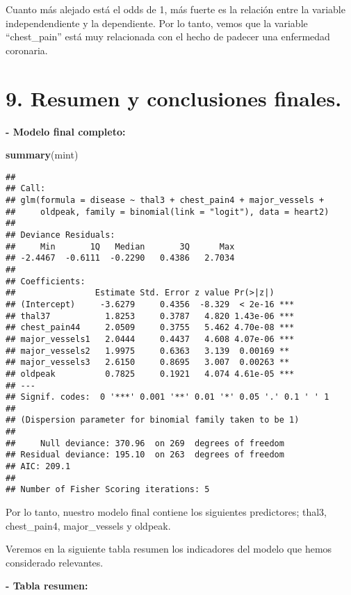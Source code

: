 \documentclass[]{article}
\newenvironment{Shaded}{\begin{snugshade}}{\end{snugshade}}
\newcommand{\KeywordTok}[1]{\textcolor[rgb]{0.13,0.29,0.53}{\textbf{#1}}}
\newcommand{\DataTypeTok}[1]{\textcolor[rgb]{0.13,0.29,0.53}{#1}}
\newcommand{\FloatTok}[1]{\textcolor[rgb]{0.00,0.00,0.81}{#1}}
\newcommand{\OperatorTok}[1]{\textcolor[rgb]{0.81,0.36,0.00}{\textbf{#1}}}
\newcommand{\NormalTok}[1]{#1}
\begin{document}
Cuanto más alejado está el odds de 1, más fuerte es la relación entre la
variable independendiente y la dependiente. Por lo tanto, vemos que la
variable ``chest\_pain'' está muy relacionada con el hecho de padecer
una enfermedad coronaria.

\section{9. Resumen y conclusiones
finales.}\label{resumen-y-conclusiones-finales.}

\textbf{- Modelo final completo:}

\begin{Shaded}
\begin{Highlighting}[]
\KeywordTok{summary}\NormalTok{(mint)}
\end{Highlighting}
\end{Shaded}

\begin{verbatim}
## 
## Call:
## glm(formula = disease ~ thal3 + chest_pain4 + major_vessels + 
##     oldpeak, family = binomial(link = "logit"), data = heart2)
## 
## Deviance Residuals: 
##     Min       1Q   Median       3Q      Max  
## -2.4467  -0.6111  -0.2290   0.4386   2.7034  
## 
## Coefficients:
##                Estimate Std. Error z value Pr(>|z|)    
## (Intercept)     -3.6279     0.4356  -8.329  < 2e-16 ***
## thal37           1.8253     0.3787   4.820 1.43e-06 ***
## chest_pain44     2.0509     0.3755   5.462 4.70e-08 ***
## major_vessels1   2.0444     0.4437   4.608 4.07e-06 ***
## major_vessels2   1.9975     0.6363   3.139  0.00169 ** 
## major_vessels3   2.6150     0.8695   3.007  0.00263 ** 
## oldpeak          0.7825     0.1921   4.074 4.61e-05 ***
## ---
## Signif. codes:  0 '***' 0.001 '**' 0.01 '*' 0.05 '.' 0.1 ' ' 1
## 
## (Dispersion parameter for binomial family taken to be 1)
## 
##     Null deviance: 370.96  on 269  degrees of freedom
## Residual deviance: 195.10  on 263  degrees of freedom
## AIC: 209.1
## 
## Number of Fisher Scoring iterations: 5
\end{verbatim}

Por lo tanto, nuestro modelo final contiene los siguientes predictores;
thal3, chest\_pain4, major\_vessels y oldpeak.

Veremos en la siguiente tabla resumen los indicadores del modelo que
hemos considerado relevantes.

\textbf{- Tabla resumen:}

\begin{Shaded}
\end{Shaded}
\end{document}
